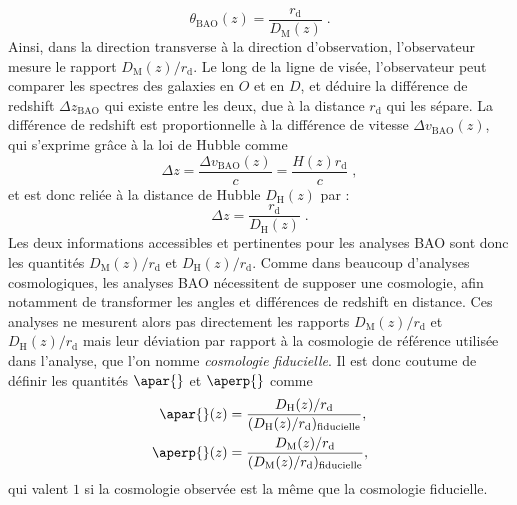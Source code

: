 \begin{equation}
  \label{eq:theta_bao}
  \theta_{\mathrm{BAO}}(z) = \frac{r_{\mathrm{d}}}{D_{\mathrm{M}}(z)} \; .
\end{equation}
Ainsi, dans la direction transverse à la direction d'observation, l'observateur mesure le rapport $D_{\mathrm{M}}(z) / r_{\mathrm{d}}$. Le long de la ligne de visée, l'observateur peut comparer les spectres des galaxies en $O$ et en $D$, et déduire la différence de redshift $\Delta z_{\mathrm{BAO}}$ qui existe entre les deux, due à la distance $r_{\mathrm{d}}$ qui les sépare. La différence de redshift est proportionnelle à la différence de vitesse $\Delta v_{\mathrm{BAO}}(z)$, qui s'exprime grâce à la loi de Hubble comme
\begin{equation}
  \label{eq:v_bao}
\Delta z =  \frac{\Delta v_{\mathrm{BAO}}(z)}{c} = \frac{H(z) r_{\mathrm{d}}}{c}  \; ,
\end{equation}
et est donc reliée à la distance de Hubble $D_{\mathrm{H}}(z)$ par :
\begin{equation}
  \label{eq:v_bao2}
  \Delta z = \frac{r_{\mathrm{d}} }{D_{\mathrm{H}}(z)} \; .
\end{equation}
Les deux informations accessibles et pertinentes pour les analyses BAO sont donc les quantités $D_{\mathrm{M}}(z) / r_{\mathrm{d}}$ et $D_{\mathrm{H}}(z) / r_{\mathrm{d}}$. Comme dans beaucoup d'analyses cosmologiques, les analyses BAO nécessitent de supposer une cosmologie, afin notamment de transformer les angles et différences de redshift en distance. Ces analyses ne mesurent alors pas directement les rapports  $D_{\mathrm{M}}(z) / r_{\mathrm{d}}$ et $D_{\mathrm{H}}(z) / r_{\mathrm{d}}$ mais leur déviation par rapport à la cosmologie de référence utilisée dans l'analyse, que l'on nomme \emph{cosmologie fiducielle}. Il est donc coutume de définir les quantités $\apar{}$ et $\aperp{}$ comme
\begin{align}
  \label{eq:apar}
  \apar{}(z) &= \frac{D_{\mathrm{H}}(z) / r_{\mathrm{d}}}{(D_{\mathrm{H}}(z) / r_{\mathrm{d}})_{\mathrm{fiducielle}}} , \\
  \label{eq:aperp}
  \aperp{}(z) &= \frac{D_{\mathrm{M}}(z) / r_{\mathrm{d}}}{(D_{\mathrm{M}}(z) / r_{\mathrm{d}})_{\mathrm{fiducielle}}} ,
\end{align}
qui valent $1$ si la cosmologie observée est la même que la cosmologie fiducielle.


